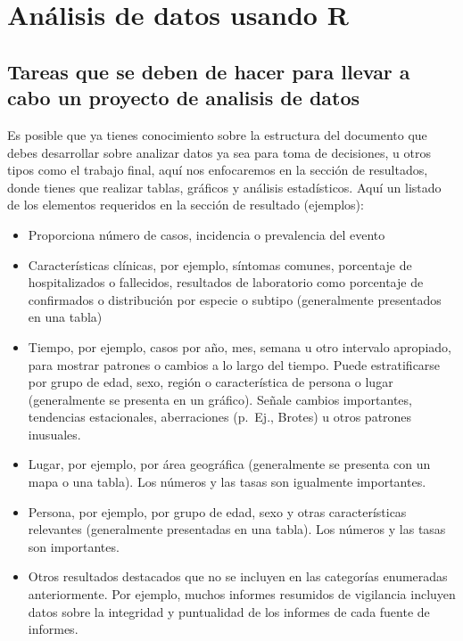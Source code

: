 \documentclass[
  letterpaper,
  DIV=11,
  numbers=noendperiod]{scrreprt}
\begin{document}
\chapter{Análisis de datos usando
R}\label{anuxe1lisis-de-datos-usando-r}

\section{Tareas que se deben de hacer para llevar a cabo un proyecto de
analisis de
datos}\label{tareas-que-se-deben-de-hacer-para-llevar-a-cabo-un-proyecto-de-analisis-de-datos}

Es posible que ya tienes conocimiento sobre la estructura del documento
que debes desarrollar sobre analizar datos ya sea para toma de
decisiones, u otros tipos como el trabajo final, aquí nos enfocaremos en
la sección de resultados, donde tienes que realizar tablas, gráficos y
análisis estadísticos. Aquí un listado de los elementos requeridos en la
sección de resultado (ejemplos):

\begin{itemize}
\item
  Proporciona número de casos, incidencia o prevalencia del evento
\item
  Características clínicas, por ejemplo, síntomas comunes, porcentaje de
  hospitalizados o fallecidos, resultados de laboratorio como porcentaje
  de confirmados o distribución por especie o subtipo (generalmente
  presentados en una tabla)
\item
  Tiempo, por ejemplo, casos por año, mes, semana u otro intervalo
  apropiado, para mostrar patrones o cambios a lo largo del tiempo.
  Puede estratificarse por grupo de edad, sexo, región o característica
  de persona o lugar (generalmente se presenta en un gráfico). Señale
  cambios importantes, tendencias estacionales, aberraciones (p.~Ej.,
  Brotes) u otros patrones inusuales.
\item
  Lugar, por ejemplo, por área geográfica (generalmente se presenta con
  un mapa o una tabla). Los números y las tasas son igualmente
  importantes.
\item
  Persona, por ejemplo, por grupo de edad, sexo y otras características
  relevantes (generalmente presentadas en una tabla). Los números y las
  tasas son importantes.
\item
  Otros resultados destacados que no se incluyen en las categorías
  enumeradas anteriormente. Por ejemplo, muchos informes resumidos de
  vigilancia incluyen datos sobre la integridad y puntualidad de los
  informes de cada fuente de informes.
\end{itemize}
\end{document}
